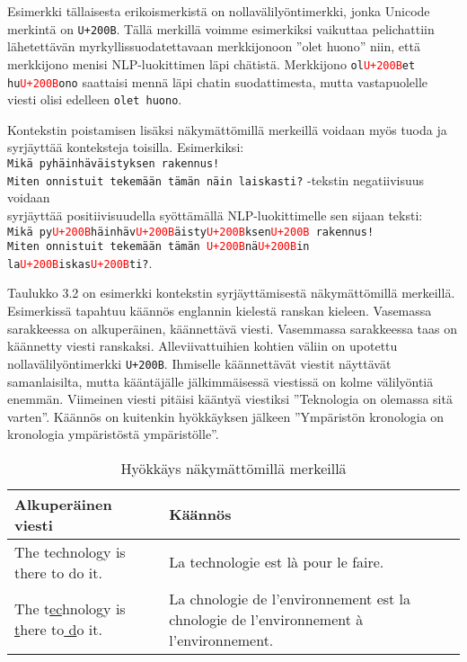 Esimerkki tällaisesta erikoismerkistä on nollavälilyöntimerkki, jonka Unicode merkintä on \texttt{U+200B}. Tällä merkillä voimme esimerkiksi vaikuttaa pelichattiin lähetettävän myrkyllissuodatettavaan merkkijonoon ''olet huono'' niin, että merkkijono menisi NLP-luokittimen läpi chätistä. Merkkijono \texttt{ol\textcolor{red}{U+200B}et hu\textcolor{red}{U+200B}ono} saattaisi mennä läpi chatin suodattimesta, mutta vastapuolelle viesti olisi edelleen \texttt{olet huono}.

Kontekstin poistamisen lisäksi näkymättömillä merkeillä voidaan myös tuoda ja syrjäyttää konteksteja toisilla. Esimerkiksi:\\
\texttt{Mikä pyhäinhäväistyksen rakennus!\\
  Miten onnistuit tekemään tämän näin laiskasti?} -tekstin negatiivisuus voidaan\\
syrjäyttää positiivisuudella syöttämällä NLP-luokittimelle sen sijaan teksti:\\
\texttt{Mikä py\textcolor{red}{U+200B}häinhäv\textcolor{red}{U+200B}äisty\textcolor{red}{U+200B}ksen\textcolor{red}{U+200B} rakennus!\\
  Miten onnistuit tekemään tämän \textcolor{red}{U+200B}nä\textcolor{red}{U+200B}in la\textcolor{red}{U+200B}iskas\textcolor{red}{U+200B}ti?}.

Taulukko 3.2 on esimerkki kontekstin syrjäyttämisestä näkymättömillä merkeillä. Esimerkissä tapahtuu käännös englannin kielestä ranskan kieleen. Vasemassa sarakkeessa on alkuperäinen, käännettävä viesti. Vasemmassa sarakkeessa taas on käännetty viesti ranskaksi. Alleviivattuihien kohtien väliin on upotettu nollavälilyöntimerkki \texttt{U+200B}. Ihmiselle käännettävät viestit näyttävät samanlaisilta, mutta kääntäjälle jälkimmäisessä viestissä on kolme välilyöntiä enemmän. Viimeinen viesti pitäisi kääntyä viestiksi ''Teknologia on olemassa sitä varten''. Käännös on kuitenkin hyökkäyksen jälkeen ''Ympäristön kronologia on kronologia ympäristöstä ympäristölle''.

\begin{table}[hbt]
  \caption{Hyökkäys näkymättömillä merkeillä \citep{boucher2021bad}}
  \begin{tabular}{| l | m{20em} |}
    \hline
    Alkuperäinen viesti & Käännös\\
    \hline
    The technology is there to do it. & La technologie est là pour le faire.\\
    \hline
    The t\underline{ec}hnology is \underline{ t}here to\underline{ d}o it. & La chnologie de l'environnement est la chnologie de l'environnement à l'environnement.\\
    \hline
  \end{tabular}
\end{table}

